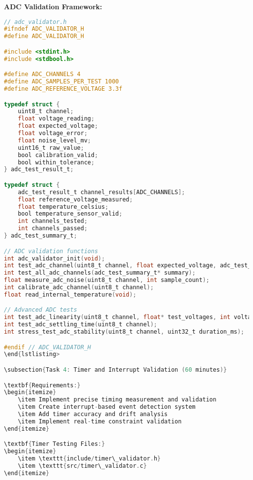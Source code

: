\documentclass[11pt,a4paper]{article}
\begin{document}
\textbf{ADC Validation Framework:}
\begin{lstlisting}[language=C]
// adc_validator.h
#ifndef ADC_VALIDATOR_H
#define ADC_VALIDATOR_H

#include <stdint.h>
#include <stdbool.h>

#define ADC_CHANNELS 4
#define ADC_SAMPLES_PER_TEST 1000
#define ADC_REFERENCE_VOLTAGE 3.3f

typedef struct {
    uint8_t channel;
    float voltage_reading;
    float expected_voltage;
    float voltage_error;
    float noise_level_mv;
    uint16_t raw_value;
    bool calibration_valid;
    bool within_tolerance;
} adc_test_result_t;

typedef struct {
    adc_test_result_t channel_results[ADC_CHANNELS];
    float reference_voltage_measured;
    float temperature_celsius;
    bool temperature_sensor_valid;
    int channels_tested;
    int channels_passed;
} adc_test_summary_t;

// ADC validation functions
int adc_validator_init(void);
int test_adc_channel(uint8_t channel, float expected_voltage, adc_test_result_t* result);
int test_all_adc_channels(adc_test_summary_t* summary);
float measure_adc_noise(uint8_t channel, int sample_count);
int calibrate_adc_channel(uint8_t channel);
float read_internal_temperature(void);

// Advanced ADC tests
int test_adc_linearity(uint8_t channel, float* test_voltages, int voltage_count);
int test_adc_settling_time(uint8_t channel);
int stress_test_adc_stability(uint8_t channel, uint32_t duration_ms);

#endif // ADC_VALIDATOR_H
\end{lstlisting>

\subsection{Task 4: Timer and Interrupt Validation (60 minutes)}

\textbf{Requirements:}
\begin{itemize}
    \item Implement precise timing measurement and validation
    \item Create interrupt-based event detection system
    \item Add timer accuracy and drift analysis
    \item Implement real-time constraint validation
\end{itemize}

\textbf{Timer Testing Files:}
\begin{itemize}
    \item \texttt{include/timer\_validator.h}
    \item \texttt{src/timer\_validator.c}
\end{itemize}


\end{lstlisting}
\end{document}
